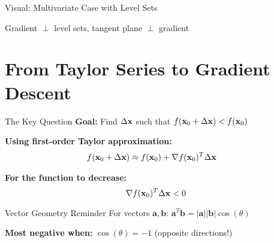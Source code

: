\documentclass[usenames,dvipsnames]{beamer}
\begin{document}
  \begin{frame}{Visual: Multivariate Case with Level Sets}
    \begin{center}
    \end{center}

    \begin{keypointsbox}{}
    Gradient $\perp$ level sets, tangent plane $\perp$ gradient
    \end{keypointsbox}
  \end{frame}

  \section{From Taylor Series to Gradient Descent}

  \begin{frame}{The Key Question}
    \textbf{Goal:} Find $\Delta \mathbf{x}$ such that $f(\mathbf{x}_0 + \Delta \mathbf{x}) < f(\mathbf{x}_0)$
    
    \pause
    \textbf{Using first-order Taylor approximation:}
    \begin{align}
        f(\mathbf{x}_0 + \Delta \mathbf{x}) &\approx f(\mathbf{x}_0) + \nabla f(\mathbf{x}_0)^T \Delta \mathbf{x}
    \end{align}
    
    \pause
    \textbf{For the function to decrease:}
    $$\nabla f(\mathbf{x}_0)^T \Delta \mathbf{x} < 0$$
    
    \pause
    \begin{alertbox}{Vector Geometry Reminder}
    For vectors $\mathbf{a}, \mathbf{b}$: $\mathbf{a}^T\mathbf{b} = |\mathbf{a}||\mathbf{b}|\cos(\theta)$
    
    \textbf{Most negative when:} $\cos(\theta) = -1$ (opposite directions!)
    \end{alertbox}
  \end{frame}
\end{document}
